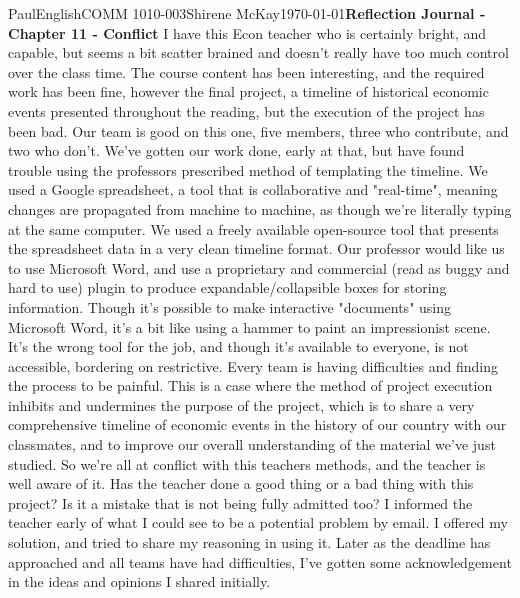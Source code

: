 \documentclass[12pt,letterpaper]{article}
\begin{document}
\begin{mla}{Paul}{English}{COMM 1010-003}{Shirene
    McKay}{\today}{\textbf{Reflection Journal - Chapter 11 - Conflict}}
I have this Econ teacher who is certainly bright, and capable, but seems a bit scatter brained and doesn't really have too much control over the class time. The course content has been interesting, and the required work has been fine, however the final project, a timeline of historical economic events presented throughout the reading, but the execution of the project has been bad. Our team is good on this one, five members, three who contribute, and two who don't. We've gotten our work done, early at that, but have found trouble using the professors prescribed method of templating the timeline. We used a Google spreadsheet, a tool that is collaborative and "real-time", meaning changes are propagated from machine to machine, as though we're literally typing at the same computer. We used a freely available open-source tool that presents the spreadsheet data in a very clean timeline format. Our professor would like us to use Microsoft Word, and use a proprietary and commercial (read as buggy and hard to use) plugin to produce expandable/collapsible boxes for storing information. Though it's possible to make interactive "documents" using Microsoft Word, it's a bit like using a hammer to paint an impressionist scene. It's the wrong tool for the job, and though it's available to everyone, is not accessible, bordering on restrictive. Every team is having difficulties and finding the process to be painful. This is a case where the method of project execution inhibits and undermines the purpose of the project, which is to share a very comprehensive timeline of economic events in the history of our country with our classmates, and to improve our overall understanding of the material we've just studied. So we're all at conflict with this teachers methods, and the teacher is well aware of it. Has the teacher done a good thing or a bad thing with this project? Is it a mistake that is not being fully admitted too? I informed the teacher early of what I could see to be a potential problem by email. I offered my solution, and tried to share my reasoning in using it. Later as the deadline has approached and all teams have had difficulties, I've gotten some acknowledgement in the ideas and opinions I shared initially.

\end{mla}
\end{document}
